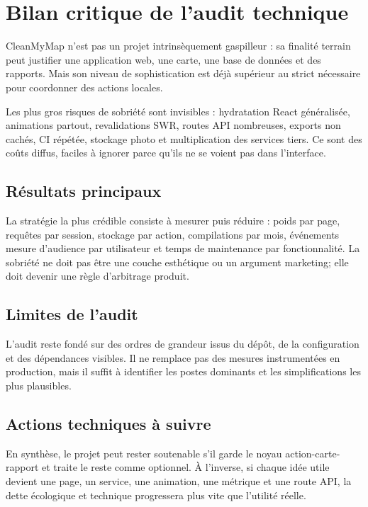 \documentclass[
  10pt,
  a4paper,
  DIV=11,
  numbers=noendperiod,
  oneside]{scrreprt}
\begin{document}
\section{Bilan critique de l'audit
technique}\label{bilan-critique-de-laudit-technique-1}

CleanMyMap n'est pas un projet intrinsèquement gaspilleur : sa finalité
terrain peut justifier une application web, une carte, une base de
données et des rapports. Mais son niveau de sophistication est déjà
supérieur au strict nécessaire pour coordonner des actions locales.

Les plus gros risques de sobriété sont invisibles : hydratation React
généralisée, animations partout, revalidations SWR, routes API
nombreuses, exports non cachés, CI répétée, stockage photo et
multiplication des services tiers. Ce sont des coûts diffus, faciles à
ignorer parce qu'ils ne se voient pas dans l'interface.

\subsection{Résultats principaux}\label{ruxe9sultats-principaux-1}

La stratégie la plus crédible consiste à mesurer puis réduire : poids
par page, requêtes par session, stockage par action, compilations par
mois, événements mesure d'audience par utilisateur et temps de
maintenance par fonctionnalité. La sobriété ne doit pas être une couche
esthétique ou un argument marketing; elle doit devenir une règle
d'arbitrage produit.

\subsection{Limites de l'audit}\label{limites-de-laudit}

L'audit reste fondé sur des ordres de grandeur issus du dépôt, de la
configuration et des dépendances visibles. Il ne remplace pas des
mesures instrumentées en production, mais il suffit à identifier les
postes dominants et les simplifications les plus plausibles.

\subsection{Actions techniques à
suivre}\label{actions-techniques-uxe0-suivre}

En synthèse, le projet peut rester soutenable s'il garde le noyau
action-carte-rapport et traite le reste comme optionnel. À l'inverse, si
chaque idée utile devient une page, un service, une animation, une
métrique et une route API, la dette écologique et technique progressera
plus vite que l'utilité réelle.
\end{document}
